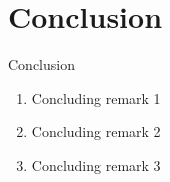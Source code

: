 \section*{Conclusion}

\begin{frame}{Conclusion}
	\begin{enumerate}
		\setlength\itemsep{\slideitemgap}
		\item Concluding remark 1
		\item Concluding remark 2
		\item Concluding remark 3
	\end{enumerate}				
\end{frame}
